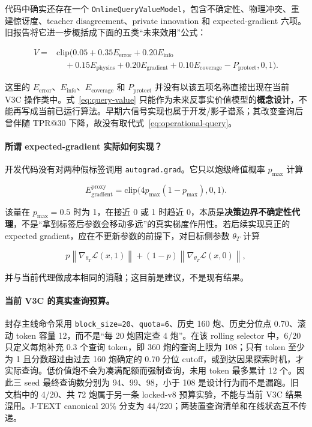 \documentclass[11pt,a4paper]{article}
\newcommand{\code}[1]{\texttt{\small #1}}
\begin{document}
代码中确实还存在一个 \code{OnlineQueryValueModel}，包含不确定性、物理冲突、重建惊讶度、teacher disagreement、private innovation 和 expected-gradient 六项。旧报告将它进一步概括成下面的五类“未来效用”公式：

\begin{equation}
\begin{aligned}
V={}&\mathrm{clip}\big(
0.05+0.35E_{\mathrm{error}}+0.20E_{\mathrm{info}}\\
&\quad+0.15E_{\mathrm{physics}}+0.20E_{\mathrm{gradient}}
+0.10E_{\mathrm{coverage}}-P_{\mathrm{protect}},0,1\big).
\end{aligned}
\label{eq:query-value}
\end{equation}

这里的 \(E_{\mathrm{error}}\)、\(E_{\mathrm{info}}\)、\(E_{\mathrm{coverage}}\) 和 \(P_{\mathrm{protect}}\) 并没有以该五项名称直接出现在当前 V3C 操作类中。式~\eqref{eq:query-value} 只能作为未来反事实价值模型的\textbf{概念设计}，不能再写成当前已运行算法。早期六信号实现也属于开发/影子谱系；其改变查询后曾伴随 TPR@30 下降，故没有取代式~\eqref{eq:operational-query}。

\paragraph{所谓 expected-gradient 实际如何实现？}
开发代码没有对两种假标签调用 \code{autograd.grad}。它只以炮级峰值概率 \(p_{\max}\) 计算

\[
E_{\mathrm{gradient}}^{\mathrm{proxy}}
=\mathrm{clip}\bigl(4p_{\max}(1-p_{\max}),0,1\bigr).
\]

该量在 \(p_{\max}=0.5\) 时为 1，在接近 0 或 1 时趋近 0，本质是\textbf{决策边界不确定性代理}，不是“拿到标签后参数会移动多远”的真实梯度作用性。若后续实现真正的 expected gradient，应在不更新参数的前提下，对目标侧参数 \(\theta_T\) 计算

\[
p\left\|\nabla_{\theta_T}\mathcal{L}(x,1)\right\|
+(1-p)\left\|\nabla_{\theta_T}\mathcal{L}(x,0)\right\|,
\]

并与当前代理做成本相同的消融；这目前是建议，不是现有结果。

\paragraph{当前 V3C 的真实查询预算。}
封存主线命令采用 \code{block\_size=20}、\code{quota=6}、历史 160 炮、历史分位点 0.70、滚动 token 容量 12，而不是“每 20 炮固定查 4 炮”。在该 rolling selector 中，6/20 只定义每炮补充 0.3 个查询 token，即 360 炮的查询上限为 108；只有 token 至少为 1 且分数超过由过去 160 炮确定的 0.70 分位 cutoff，或到达因果探索时机，才实际查询。低价值炮不会为凑满配额而强制查询，未用 token 最多累计 12 个。因此三 seed 最终查询数分别为 94、99、98，小于 108 是设计行为而不是漏跑。旧文档中的 4/20、共 72 炮属于另一条 locked-v8 预算实验，不能与当前 V3C 结果混用。J-TEXT canonical 20\% 分支为 44/220；两装置查询清单和在线状态互不传递。
\end{document}
